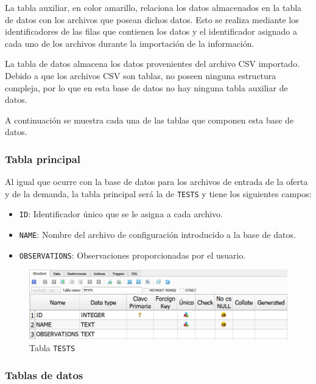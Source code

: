La tabla auxiliar, en color amarillo, relaciona los datos almacenados en la tabla de datos con los archivos que posean dichos datos. Esto se realiza mediante los identificadores de las filas que contienen los datos y el identificador asignado a cada uno de los archivos durante la importación de la información.

La tabla de datos almacena los datos provenientes del archivo \acrshort{CSV} importado. Debido a que los archivos \acrshort{CSV} son tablas, no poseen ninguna estructura compleja, por lo que en esta base de datos no hay ninguna tabla auxiliar de datos.

A continuación se muestra cada una de las tablas que componen esta base de datos.

\subsubsection{Tabla principal}

Al igual que ocurre con la base de datos para los archivos de entrada de la oferta y de la demanda, la tabla principal será la de \texttt{TESTS} y tiene los siguientes campos:
\begin{itemize}
    \item \texttt{ID}: Identificador único que se le asigna a cada archivo.
    \item \texttt{NAME}: Nombre del archivo de configuración introducido a la base de datos.
    \item \texttt{OBSERVATIONS}: Observaciones proporcionadas por el usuario.
\end{itemize}

\begin{figure}[H]
\centering
\includegraphics[width=.9\textwidth]{fig/Tablas base de datos/Resultados/TESTS.png}
\caption{Tabla \texttt{TESTS}}
\label{fig:dbResultsTESTS}
\end{figure}

\subsubsection{Tablas de datos}

